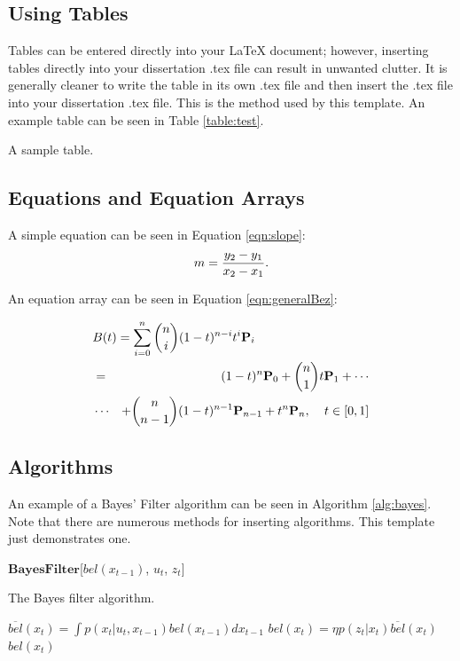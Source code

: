 \documentclass[10pt]{report}  %
\begin{document}
\subsection{Using Tables}
Tables can be entered directly into your LaTeX document; however, inserting tables directly into your dissertation .tex file can result in unwanted clutter. It is generally cleaner to write the table in its own .tex file and then insert the .tex file into your dissertation .tex file. This is the method used by this template. An example table can be seen in Table \ref{table:test}.

\begin{table}
\scriptsize
\renewcommand{\tabcolsep}{0.09cm}
\centering

\caption{A sample table.}
\label{table:test}
\end{table}

\subsection{Equations and Equation Arrays}
A simple equation can be seen in Equation \ref{eqn:slope}:
\begin{equation}
\centering
m = \frac{y_{2} - y_{1}}{x_{2} - x_{1}}.
\label{eqn:slope}
\end{equation}

An equation array can be seen in Equation \ref{eqn:generalBez}: 

\begin{eqnarray}
\lefteqn{B(t) =  \sum_{i=0}^n \binom{n}{i} (1-t)^{n-i}t^{i}\bold{P}_i }\nonumber \\ 
& = & (1-t)^{n}\bold{P}_0 + \binom{n}{1}t\bold{P}_1+ \cdots  \nonumber \\
 &\cdots & + \binom{n}{n-1}(1-t)^{n-1}\bold{P}_{n-1} + t^{n}\bold{P}_n, \phantom{ttt} t \in [0,1]
\label{eqn:generalBez}
\end{eqnarray}

\subsection{Algorithms}
An example of a Bayes' Filter \citep*{Thrun2005} algorithm can be seen in Algorithm \ref{alg:bayes}. Note that there are numerous methods for inserting algorithms. This template just demonstrates one.

\begin{algorithm}{$\mathbf{Bayes Filter}$}[$bel(x_{t-1})$, $u_t$, $z_t$]
\caption{The Bayes filter algorithm.}
\label{alg:bayes}
\begin{algorithmic}[1]
\STATE $\overline{bel}(x_t) = \int p(x_t | u_t, x_{t-1}) bel(x_{t-1})dx_{t-1}$
\STATE $bel(x_t) = \eta p(z_t | x_t) \overline{bel}(x_t)$
\ENDFOR
\RETURN $bel(x_t)$
\end{algorithmic}
\end{algorithm}
\end{document}
